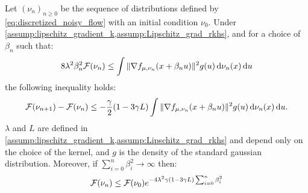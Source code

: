 \begin{proposition}\label{thm:convergence_noisy_gradient}
	Let $(\nu_n)_{n\geq 0}$ be the sequence of distributions defined by \cref{eq:discretized_noisy_flow} with an initial condition $\nu_0$. Under \cref{assump:lipschitz_gradient_k,assump:Lipschitz_grad_rkhs}, and for a choice of $\beta_n$ such that:
	\begin{align}\label{eq:control_level_noise}
		8\lambda^2\beta_n^2 {{\mathcal F}}(\nu_n) \leq \int \Vert \nabla f_{\mu,\nu_n}(x+\beta_n u) \Vert^2 g(u) \mathop{}\!\mathrm{d} \nu_n(x)\mathop{}\!\mathrm{d} u   
	\end{align}
	 the following inequality holds:
	\begin{align}\label{eq:decreasing_loss_iterations}
		{{\mathcal F}}(\nu_{n+1}) - {{\mathcal F}}(\nu_n  ) \leq -\frac{\gamma}{2}(1-3\gamma L)\int \Vert \nabla f_{\mu,\nu_n}(x+\beta_n u) \Vert^2 g(u) \mathop{}\!\mathrm{d}\nu_n(x) \mathop{}\!\mathrm{d} u.
	\end{align}
$\lambda$ and $L$ are defined in \cref{assump:lipschitz_gradient_k,assump:Lipschitz_grad_rkhs} and depend only on the choice of the kernel, and $g$ is the density of the standard gaussian distribution. Moreover, if  $\sum_{i=0}^n \beta_i^2 \rightarrow \infty $ then:
\begin{align}
{{\mathcal F}}(\nu_n)\leq {{\mathcal F}}(\nu_0) e^{-4\lambda^2\gamma(1-3\gamma L)\sum_{i=0}^n \beta^2_i}
\end{align}
\end{proposition}

